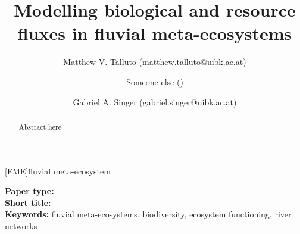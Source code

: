 



%
%

\title{Modelling biological and resource fluxes in fluvial meta-ecosystems}
\author[1,*]{Matthew V. Talluto (matthew.talluto@uibk.ac.at)}
\author[2]{Someone else ()}
\author[1,3]{Gabriel A. Singer (gabriel.singer@uibk.ac.at)}


\newcommand{\fitem}[2]{\item {\bfseries #1} \\ #2}



\begin{acronym}
	[FME]{fluvial meta-ecosystem}
\end{acronym}


\begin{titlepage}
	\maketitle
	\begin{flushleft}
		\textbf{Paper type:} \\
		\textbf{Short title:} \\
		\textbf{Keywords:} fluvial meta-ecosystems, biodiversity, ecosystem functioning, river networks
	\end{flushleft}

	\begin{abstract}
		Abstract here
	\end{abstract}
\end{titlepage}

